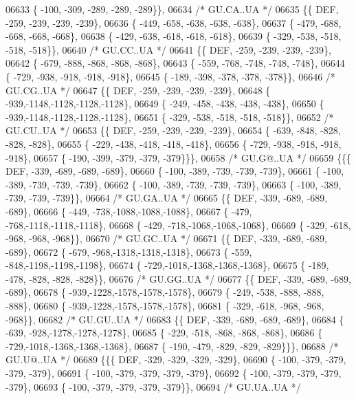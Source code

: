\begin{DoxyCode}
06633 \{ -100, -309, -289, -289, -289\}\},
06634 \textcolor{comment}{/* GU.CA..UA */}
06635 \{\{  DEF, -259, -239, -239, -239\},
06636 \{ -449, -658, -638, -638, -638\},
06637 \{ -479, -688, -668, -668, -668\},
06638 \{ -429, -638, -618, -618, -618\},
06639 \{ -329, -538, -518, -518, -518\}\},
06640 \textcolor{comment}{/* GU.CC..UA */}
06641 \{\{  DEF, -259, -239, -239, -239\},
06642 \{ -679, -888, -868, -868, -868\},
06643 \{ -559, -768, -748, -748, -748\},
06644 \{ -729, -938, -918, -918, -918\},
06645 \{ -189, -398, -378, -378, -378\}\},
06646 \textcolor{comment}{/* GU.CG..UA */}
06647 \{\{  DEF, -259, -239, -239, -239\},
06648 \{ -939,-1148,-1128,-1128,-1128\},
06649 \{ -249, -458, -438, -438, -438\},
06650 \{ -939,-1148,-1128,-1128,-1128\},
06651 \{ -329, -538, -518, -518, -518\}\},
06652 \textcolor{comment}{/* GU.CU..UA */}
06653 \{\{  DEF, -259, -239, -239, -239\},
06654 \{ -639, -848, -828, -828, -828\},
06655 \{ -229, -438, -418, -418, -418\},
06656 \{ -729, -938, -918, -918, -918\},
06657 \{ -190, -399, -379, -379, -379\}\}\},
06658 \textcolor{comment}{/* GU.G@..UA */}
06659 \{\{\{  DEF, -339, -689, -689, -689\},
06660 \{ -100, -389, -739, -739, -739\},
06661 \{ -100, -389, -739, -739, -739\},
06662 \{ -100, -389, -739, -739, -739\},
06663 \{ -100, -389, -739, -739, -739\}\},
06664 \textcolor{comment}{/* GU.GA..UA */}
06665 \{\{  DEF, -339, -689, -689, -689\},
06666 \{ -449, -738,-1088,-1088,-1088\},
06667 \{ -479, -768,-1118,-1118,-1118\},
06668 \{ -429, -718,-1068,-1068,-1068\},
06669 \{ -329, -618, -968, -968, -968\}\},
06670 \textcolor{comment}{/* GU.GC..UA */}
06671 \{\{  DEF, -339, -689, -689, -689\},
06672 \{ -679, -968,-1318,-1318,-1318\},
06673 \{ -559, -848,-1198,-1198,-1198\},
06674 \{ -729,-1018,-1368,-1368,-1368\},
06675 \{ -189, -478, -828, -828, -828\}\},
06676 \textcolor{comment}{/* GU.GG..UA */}
06677 \{\{  DEF, -339, -689, -689, -689\},
06678 \{ -939,-1228,-1578,-1578,-1578\},
06679 \{ -249, -538, -888, -888, -888\},
06680 \{ -939,-1228,-1578,-1578,-1578\},
06681 \{ -329, -618, -968, -968, -968\}\},
06682 \textcolor{comment}{/* GU.GU..UA */}
06683 \{\{  DEF, -339, -689, -689, -689\},
06684 \{ -639, -928,-1278,-1278,-1278\},
06685 \{ -229, -518, -868, -868, -868\},
06686 \{ -729,-1018,-1368,-1368,-1368\},
06687 \{ -190, -479, -829, -829, -829\}\}\},
06688 \textcolor{comment}{/* GU.U@..UA */}
06689 \{\{\{  DEF, -329, -329, -329, -329\},
06690 \{ -100, -379, -379, -379, -379\},
06691 \{ -100, -379, -379, -379, -379\},
06692 \{ -100, -379, -379, -379, -379\},
06693 \{ -100, -379, -379, -379, -379\}\},
06694 \textcolor{comment}{/* GU.UA..UA */}

\end{DoxyCode}
